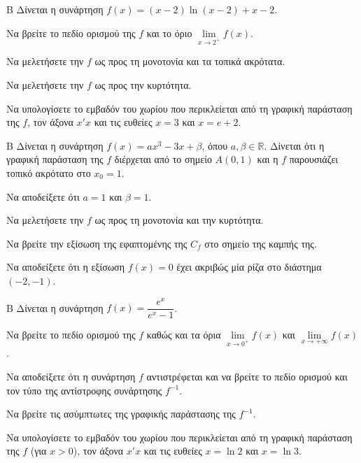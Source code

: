 \begin{thema}{Β}
Δίνεται η συνάρτηση $f(x) = (x-2)\ln(x-2) + x - 2$.
\begin{erwthma}
\item Να βρείτε το πεδίο ορισμού της $f$ και το όριο $\lim\limits_{x \to 2^+} f(x)$.
\item Να μελετήσετε την $f$ ως προς τη μονοτονία και τα τοπικά ακρότατα.
\item Να μελετήσετε την $f$ ως προς την κυρτότητα.
\item Να υπολογίσετε το εμβαδόν του χωρίου που περικλείεται από τη γραφική παράσταση της $f$, τον άξονα $x'x$ και τις ευθείες $x=3$ και $x=e+2$.
\end{erwthma}
\end{thema}

\begin{thema}{Β}
Δίνεται η συνάρτηση $f(x) = a x^3 - 3x + \beta$, όπου $a, \beta \in \mathbb{R}$. Δίνεται ότι η γραφική παράσταση της $f$ διέρχεται από το σημείο $A(0, 1)$ και η $f$ παρουσιάζει τοπικό ακρότατο στο $x_0 = 1$.
\begin{erwthma}
\item Να αποδείξετε ότι $a=1$ και $\beta=1$.
\item Να μελετήσετε την $f$ ως προς τη μονοτονία και την κυρτότητα.
\item Να βρείτε την εξίσωση της εφαπτομένης της $C_f$ στο σημείο της καμπής της.
\item Να αποδείξετε ότι η εξίσωση $f(x) = 0$ έχει ακριβώς μία ρίζα στο διάστημα $(-2, -1)$.
\end{erwthma}
\end{thema}

\begin{thema}{Β}
Δίνεται η συνάρτηση $f(x) = \dfrac{e^x}{e^x-1}$.
\begin{erwthma}
\item Να βρείτε το πεδίο ορισμού της $f$ καθώς και τα όρια $\lim\limits_{x \to 0^+} f(x)$ και $\lim\limits_{x \to +\infty} f(x)$.
\item Να αποδείξετε ότι η συνάρτηση $f$ αντιστρέφεται και να βρείτε το πεδίο ορισμού και τον τύπο της αντίστροφης συνάρτησης $f^{-1}$.
\item Να βρείτε τις ασύμπτωτες της γραφικής παράστασης της $f^{-1}$.
\item Να υπολογίσετε το εμβαδόν του χωρίου που περικλείεται από τη γραφική παράσταση της $f$ (για $x>0$), τον άξονα $x'x$ και τις ευθείες $x=\ln 2$ και $x=\ln 3$.
\end{erwthma}
\end{thema}

